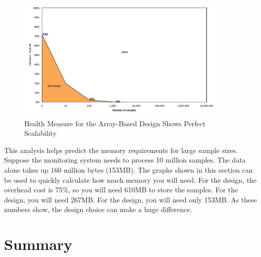 \begin{figure}
  \centering
  \includegraphics[width=0.9\textwidth]{part1/Figures/memoryhealth/scalable-health-array}
  \caption{Health Measure for the Array-Based Design Shows Perfect Scalability}
  \label{fig:scalable-health-array}
\end{figure}

This analysis helps predict the memory requirements for large sample sizes.
Suppose the monitoring system needs to process 10 million samples. The data
alone takes up 160 million bytes (153MB).  The graphs shown in this section can
be used to quickly calculate how much memory you will need. For the
 design, the overhead cost is 75\%, so you will need 610MB to
store the samples. For the  design, you will need 267MB. For the
 design, you will need only 153MB. As these numbers show, the design
choice can make a huge difference.

\section{Summary}

